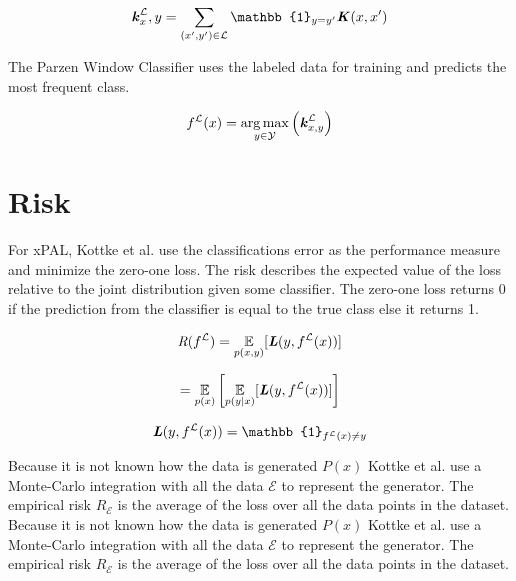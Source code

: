 \begin{equation}
\textbf{\textit{k}}^{\mathcal{L}}_x,y = \sum_{(x',y') \in \mathcal{L}} \mathbb{1}_{y=y'} \textbf{\textit{K}}(x,x')
\label{eq:kernel}
\end{equation}

The Parzen Window Classifier uses the labeled data for training and predicts the most frequent class. 

\begin{equation}
f^{\mathcal{L}}(x) = \underset{y \in \mathcal{Y}}{\arg \max} \left( \textbf{\textit{k}}^{\mathcal{L}}_{x,y} \right)
\end{equation}

\section{Risk}

For xPAL, Kottke et al. use the classifications error as the performance measure and minimize the zero-one loss. The risk describes the expected value of the loss relative to the joint distribution given some classifier. The zero-one loss returns 0 if the prediction from the classifier is equal to the true class else it returns 1.

\begin{equation}
\textit{R}(f^{\mathcal{L}}) = \underset{p(x,y)}{\mathbb{E}} [ \textbf{\textit{L}}(y,f^{\mathcal{L}}(x)) ]
\end{equation}

\begin{equation}
= \underset{p(x)}{\mathbb{E}} \left[ \underset{p(y|x)}{\mathbb{E}} [ \textbf{\textit{L}}(y,f^{\mathcal{L}}(x)) ] \right]
\end{equation}

\begin{equation}
\textbf{\textit{L}}(y,f^{\mathcal{L}}(x)) = \mathbb{1}_{f^{\mathcal{L}}(x)\neq y}
\end{equation}

Because it is not known how the data is generated $P(x)$ Kottke et al. use a Monte-Carlo integration with all the data $\mathcal{E}$ to represent the generator. The empirical risk $\textit{R}_{\mathcal{E}}$ is the average of the loss over all the data points in the dataset.
Because it is not known how the data is generated $P(x)$ Kottke et al. use a Monte-Carlo integration with all the data $\mathcal{E}$ to represent the generator. The empirical risk $\textit{R}_{\mathcal{E}}$ is the average of the loss over all the data points in the dataset.

